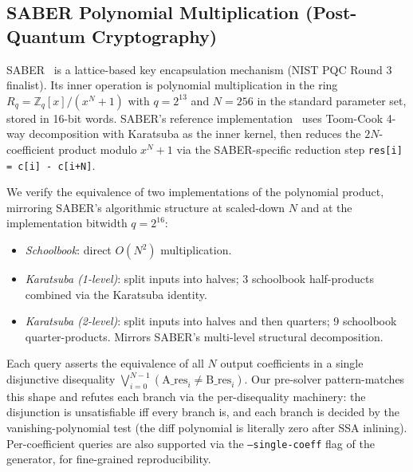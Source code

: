 \documentclass[runningheads]{llncs}
\begin{document}
\subsection{SABER Polynomial Multiplication (Post-Quantum Cryptography)}
\label{sec:eval-saber}

SABER~\cite{daemen2018saber} is a lattice-based key encapsulation
mechanism (NIST PQC Round 3 finalist). Its inner operation is
polynomial multiplication in the ring $R_q = \mathbb{Z}_q[x] / (x^N + 1)$
with $q = 2^{13}$ and $N = 256$ in the standard parameter set,
stored in 16-bit words. SABER's reference
implementation~\cite{KULeuvenSABER} uses Toom-Cook 4-way
decomposition with Karatsuba as the inner kernel, then reduces
the $2N$-coefficient product modulo $x^N + 1$ via the
SABER-specific reduction step
\texttt{res[i] = c[i] - c[i+N]}.

We verify the equivalence of two implementations of the
polynomial product, mirroring SABER's algorithmic structure at
scaled-down $N$ and at the implementation bitwidth $q = 2^{16}$:

\begin{itemize}
\item \emph{Schoolbook}: direct $O(N^2)$ multiplication.
\item \emph{Karatsuba (1-level)}: split inputs into halves; 3
  schoolbook half-products combined via the Karatsuba
  identity.
\item \emph{Karatsuba (2-level)}: split inputs into halves and
  then quarters; 9 schoolbook quarter-products. Mirrors SABER's
  multi-level structural decomposition.
\end{itemize}

Each query asserts the equivalence of all $N$ output coefficients
in a single disjunctive disequality
$\bigvee_{i=0}^{N-1} (\text{A\_res}_i \neq \text{B\_res}_i)$.
Our pre-solver pattern-matches this shape and refutes each
branch via the per-disequality machinery: the disjunction is
unsatisfiable iff every branch is, and each branch is decided
by the vanishing-polynomial test (the diff polynomial is
literally zero after SSA inlining). Per-coefficient queries are
also supported via the \texttt{--single-coeff} flag of the
generator, for fine-grained reproducibility.
\end{document}
